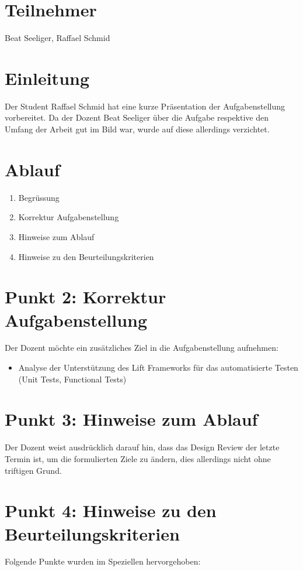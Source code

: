 \section{Teilnehmer}
Beat Seeliger, Raffael Schmid

\section{Einleitung}
Der Student Raffael Schmid hat eine kurze Pr\"asentation der Aufgabenstellung vorbereitet. Da 
der Dozent Beat Seeliger \"uber die Aufgabe respektive den Umfang der Arbeit gut im Bild war, wurde auf diese allerdings verzichtet.

\section{Ablauf}
\begin{enumerate} 

\item Begr\"ussung
\item Korrektur Aufgabenstellung
\item Hinweise zum Ablauf
\item Hinweise zu den Beurteilungskriterien

\end{enumerate}

\section {Punkt 2: Korrektur Aufgabenstellung}
Der Dozent m\"ochte ein zus\"atzliches Ziel in die Aufgabenstellung aufnehmen:
\begin{itemize}
\item Analyse der Unterst\"utzung des Lift Frameworks f\"ur das automatisierte Testen (Unit Tests, Functional Tests)
\end{itemize}

\section {Punkt 3: Hinweise zum Ablauf}
Der Dozent weist ausdr\"ucklich darauf hin, dass das Design Review der letzte Termin ist, um die formulierten Ziele zu \"andern, dies allerdings nicht ohne triftigen Grund.

\section{Punkt 4: Hinweise zu den Beurteilungskriterien}
Folgende Punkte wurden im Speziellen hervorgehoben:
